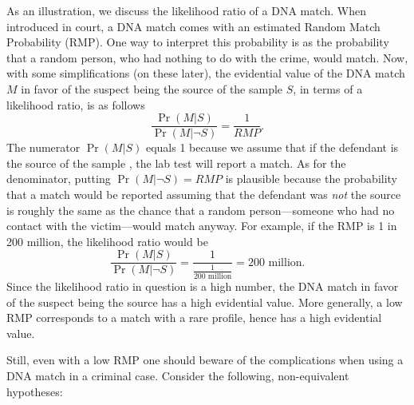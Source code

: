 \documentclass[10pt]{article}
\begin{document}
As an illustration, we discuss the likelihood ratio 
of a DNA match. %
When introduced in court, a DNA match comes with an 
estimated Random Match Probability (RMP). One way to interpret this probability is 
as the probability that a random person, who 
had nothing to do with the crime, would match. %
%
Now, with some simplifications (on these later), 
the evidential value of the DNA 
match $M$ in favor of the suspect being the source of the sample $S$, in terms of a likelihood ratio, 
is as follows %
%
\[
\frac{\Pr(M | S)}{\Pr(M | \neg S)} =  \frac{1}{RMP}.
\]
%
The numerator $\Pr(M | S)$ equals 1 because we assume that %
if the defendant is the source of the sample%
, the lab test will report a match. As for the denominator, 
putting $\Pr(M | \neg S)=RMP$ is plausible because the probability that a match would be reported assuming that the defendant was \textit{not} 
the source is roughly the same as the chance that a random person---someone who had no contact with the victim---would match anyway. 
For example, if the RMP is 1 in 200 million, the likelihood ratio would be
%
\[\frac{\Pr(M |S)}{\Pr( M | \neg S)}=\frac{1}{\frac{1}{\text{200 million}}}=\text{200 million}.\]
%
Since the likelihood ratio in question is a high number, the DNA match in favor of the suspect being the source
has a high evidential value. More generally, a low RMP corresponds to a match with a rare profile, hence has a high evidential value. 

Still, even with a low RMP one should beware of the complications when using a DNA match in a criminal case. %
Consider the following, non-equivalent hypotheses: %
\end{document}
